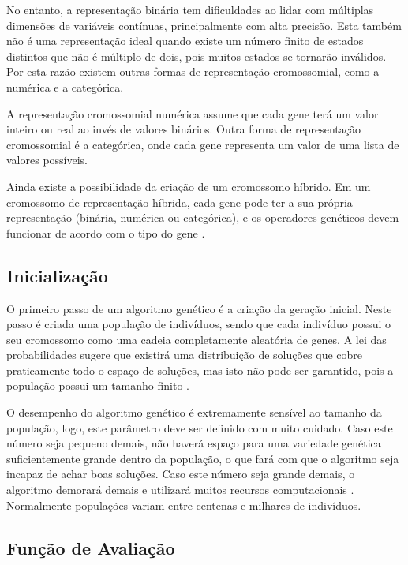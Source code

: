 \documentclass[12pt,oneside,a4paper,english,french,spanish,brazil,]{abntex2}
\begin{document}
No entanto, a representação binária tem dificuldades ao lidar com múltiplas dimensões de variáveis contínuas, principalmente com alta precisão. Esta também não é uma representação ideal quando existe um número finito de estados distintos que não é múltiplo de dois, pois muitos estados se tornarão inválidos. Por esta razão existem outras formas de representação cromossomial, como a numérica e a categórica.

A representação cromossomial numérica assume que cada gene terá um valor inteiro ou real ao invés de valores binários. Outra forma de representação cromossomial é a categórica, onde cada gene representa um valor de uma lista de valores possíveis.

Ainda existe a possibilidade da criação de um cromossomo híbrido. Em um cromossomo de representação híbrida, cada gene pode ter a sua própria representação (binária, numérica ou categórica), e os operadores genéticos devem funcionar de acordo com o tipo do gene \cite{linden:2008}.

\subsection{Inicialização}

O primeiro passo de um algoritmo genético é a criação da geração inicial. Neste passo é criada uma população de indivíduos, sendo que cada indivíduo possui o seu cromossomo como uma cadeia completamente aleatória de genes. A lei das probabilidades sugere que existirá uma distribuição de soluções que cobre praticamente todo o espaço de soluções, mas isto não pode ser garantido, pois a população possui um tamanho finito \cite{linden:2008}.

O desempenho do algoritmo genético é extremamente sensível ao tamanho da população, logo, este parâmetro deve ser definido com muito cuidado. Caso este número seja pequeno demais, não haverá espaço para uma variedade genética suficientemente grande dentro da população, o que fará com que o algoritmo seja incapaz de achar boas soluções. Caso este número seja grande demais, o algoritmo demorará demais e utilizará muitos recursos computacionais  \cite{linden:2008}. Normalmente populações variam entre centenas e milhares de indivíduos.

\subsection{Função de Avaliação}
\label{sec:Funcao_de_Avaliacao}
\end{document}
